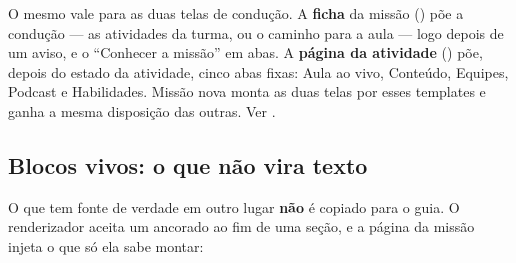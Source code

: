 O mesmo vale para as duas telas de condução. A \textbf{ficha} da missão
() põe a condução --- as atividades
da turma, ou o caminho para a aula --- logo depois de um aviso, e o
\enquote{Conhecer a missão} em abas. A \textbf{página da atividade}
() põe, depois do estado da
atividade, cinco abas fixas: Aula ao vivo, Conteúdo, Equipes, Podcast e
Habilidades. Missão nova monta as duas telas por esses templates e ganha a
mesma disposição das outras. Ver .

\subsection{Blocos vivos: o que não vira texto}

O que tem fonte de verdade em outro lugar \textbf{não} é copiado para o guia. O
renderizador aceita um  ancorado ao fim de uma seção, e a página
da missão injeta o que só ela sabe montar:

